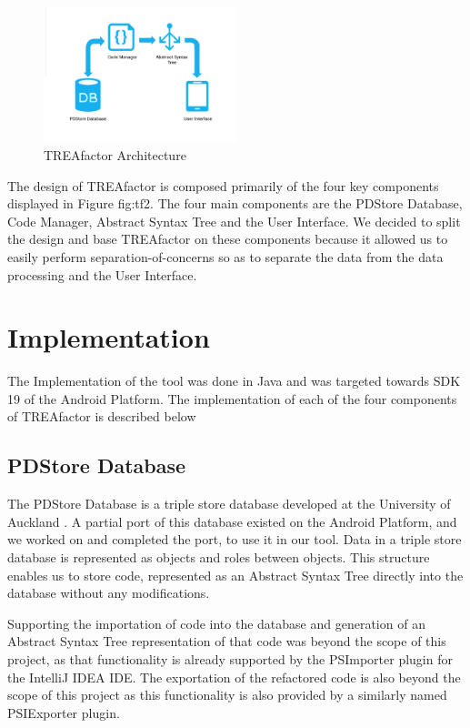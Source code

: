 \documentclass[10.5pt,twocolumn]{article}
\begin{document}
\begin{figure}[h]
    \centering
    \includegraphics[width=0.5\textwidth]{architecture}
    \caption{TREAfactor Architecture}
    \label{fig:tf2}
\end{figure}

The design of TREAfactor is composed primarily of the four key components displayed in Figure {fig:tf2}. The four main components are the PDStore Database, Code Manager, Abstract Syntax Tree and the User Interface. We decided to split the design and base TREAfactor on these components because it allowed us to easily perform separation-of-concerns so as to separate the data from the data processing and the User Interface.  


\section{Implementation}
The Implementation of the tool was done in Java and was targeted towards SDK 19 of the Android Platform. The implementation of each of the four components of TREAfactor is described below

\subsection{PDStore Database}
The PDStore Database is a triple store database developed at the University of Auckland \cite{PDS}. A partial port of this database existed on the Android Platform, and we worked on and completed the port, to use it in our tool. Data in a triple store database is represented as objects and roles between objects. This structure enables us to store code, represented as an Abstract Syntax Tree directly into the database without any modifications. 

Supporting the importation of code into the database and generation of an Abstract Syntax Tree representation of that code was beyond the scope of this project, as that functionality is already supported by the PSImporter plugin for the IntelliJ IDEA IDE. The exportation of the refactored code is also beyond the scope of this project as this functionality is also provided by a similarly named PSIExporter plugin. 
\end{document}
